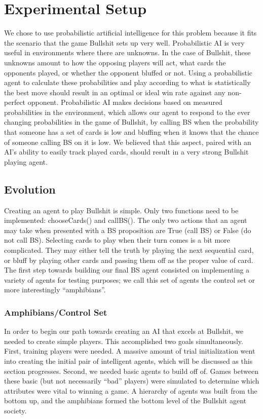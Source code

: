 \documentclass[a4paper,11pt]{article}
\begin{document}
\section{Experimental Setup}
	We chose to use probabilistic artificial intelligence for this problem because it fits the scenario that the game Bullshit sets up very well. Probabilistic AI is very useful in environments where there are unknowns. In the case of Bullshit, these unknowns amount to how the opposing players will act, what cards the opponents played, or whether the opponent bluffed or not. Using a probabilistic agent to calculate these probabilities and play according to what is statistically the best move should result in an optimal or ideal win rate against any non-perfect opponent. Probabilistic AI makes decisions based on measured probabilities in the environment, which allows our agent to respond to the ever changing probabilities in the game of Bullshit, by calling BS when the probability that someone has a set of cards is low and bluffing when it knows that the chance of someone calling BS on it is low. We believed that this aspect, paired with an AI’s ability to easily track played cards, should result in a very strong Bullshit playing agent. 


	\subsection{Evolution}
	Creating an agent to play Bullshit is simple. Only two functions need to be implemented: chooseCards() and callBS(). The only two actions that an agent may take when presented with a BS proposition are True (call BS) or False (do not call BS). Selecting cards to play when their turn comes is a bit more complicated. They may either tell the truth by playing the next sequential card, or bluff by playing other cards and passing them off as the proper value of card. The first step towards building our final BS agent consisted on implementing a variety of agents for testing purposes; we call this set of agents the control set or more interestingly “amphibians”.

	\subsubsection{Amphibians/Control Set}
	In order to begin our path towards creating an AI that excels at Bullshit, we needed to create simple players. This accomplished two goals simultaneously. First, training players were needed. A massive amount of trial initialization went into creating the initial pair of intelligent agents, which will be discussed as this section progresses. Second, we needed basic agents to build off of. Games between these basic (but not necessarily “bad” players) were simulated to determine which attributes were vital to winning a game. A hierarchy of agents was built from the bottom up, and the amphibians formed the bottom level of the Bullshit agent society.
\end{document}
